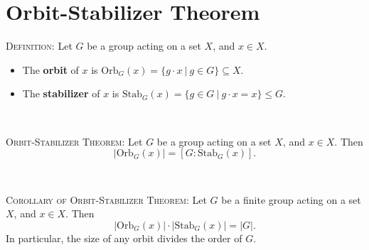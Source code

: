 \documentclass[12pt]{amsart}
\newcommand{\showsol}[1]{\def\displaysol{#1}}
\begin{document}
\showsol{0}
	
	\thispagestyle{empty}
	
	\section*{Orbit-Stabilizer Theorem}
	
	

\begin{framed}
\textsc{Definition:} Let $G$ be a group acting on a set $X$, and $x\in X$.
\begin{itemize}
\item The \textbf{orbit} of $x$ is $\mathrm{Orb}_G(x) = \{ g\cdot x  \ | \ g\in G\} \subseteq X$.
\item The \textbf{stabilizer} of $x$ is $\mathrm{Stab}_G(x) = \{ g\in G \ | \ g \cdot x = x\} \leq G$.
\end{itemize}

\

\textsc{Orbit-Stabilizer Theorem:} Let $G$ be a group acting on a set $X$, and $x\in X$. Then
\[ | \mathrm{Orb}_G(x) | = [ G : \mathrm{Stab}_G(x) ].\]

\

\textsc{Corollary of Orbit-Stabilizer Theorem:} Let $G$ be a finite group acting on a set $X$, and $x\in X$. Then
\[  | \mathrm{Orb}_G(x) | \cdot |  \mathrm{Stab}_G(x) | = | G |.\]
In particular, the size of any orbit divides the order of $G$.
\end{framed}
\end{document}
